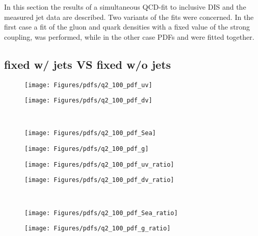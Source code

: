 In this section the results of a simultaneous QCD-fit to inclusive DIS and the measured jet data are described. Two variants of the fits were concerned. In the first case a fit of the gluon and quark densities with a fixed value of the strong coupling, was performed, while in the other case PDFs and \asz were fitted together.

\newpage
\subsection{\as fixed w/ jets VS \as fixed w/o jets}
\label{subsec:asthunc}

\begin{figure}[t]
 \begin{center}
\begin{subfloat}[]{\texttt{[image: Figures/pdfs/q2\_100\_pdf\_uv]}
   \label{fig:aschi2scanpdf_a}
 }%
\end{subfloat}
\begin{subfloat}[]{\texttt{[image: Figures/pdfs/q2\_100\_pdf\_dv]}
   \label{fig:aschi2scanpdf_b}
 }%
\end{subfloat}
\\
\begin{subfloat}[]{\texttt{[image: Figures/pdfs/q2\_100\_pdf\_Sea]}
   \label{fig:aschi2scanpdf_a}
 }%
\end{subfloat}
\begin{subfloat}[]{\texttt{[image: Figures/pdfs/q2\_100\_pdf\_g]}
   \label{fig:aschi2scanpdf_b}
 }%
\end{subfloat}
\end{center}
 \caption{}
 \label{fig:aschi2scanpdf}
\end{figure}
\newpage
\begin{figure}[t]
 \begin{center}
\begin{subfloat}[]{\texttt{[image: Figures/pdfs/q2\_100\_pdf\_uv\_ratio]}
   \label{fig:aschi2scanpdf_a}
 }%
\end{subfloat}
\begin{subfloat}[]{\texttt{[image: Figures/pdfs/q2\_100\_pdf\_dv\_ratio]}
   \label{fig:aschi2scanpdf_b}
 }%
\end{subfloat}
\\
\begin{subfloat}[]{\texttt{[image: Figures/pdfs/q2\_100\_pdf\_Sea\_ratio]}
   \label{fig:aschi2scanpdf_a}
 }%
\end{subfloat}
\begin{subfloat}[]{\texttt{[image: Figures/pdfs/q2\_100\_pdf\_g\_ratio]}
   \label{fig:aschi2scanpdf_b}
 }%
\end{subfloat}
\end{center}
 \caption{}
 \label{fig:aschi2scanpdf}
\end{figure}

